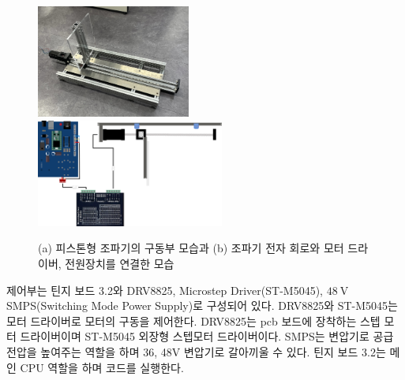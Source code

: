 \begin{figure}[H]
        \includegraphics[width=0.45\textwidth]{images/jopagi.jpg} 
        \includegraphics[width=0.55\textwidth]{images/wavemaker_control.png}
    \caption{(a) 피스톤형 조파기의 구동부 모습과 (b) 조파기 전자 회로와 모터 드라이버, 전원장치를 연결한 모습}
    \label{circuit}   
\end{figure} 


제어부는 틴지 보드 3.2와 DRV8825, Microstep Driver(ST-M5045), $48\mathrm{~V}$ SMPS(Switching Mode Power Supply)로 구성되어 있다. DRV8825와 ST-M5045는 모터 드라이버로 모터의 구동을 제어한다. DRV8825는 pcb 보드에 장착하는 스텝 모터 드라이버이며 ST-M5045 외장형 스텝모터 드라이버이다. SMPS는 변압기로 공급 전압을 높여주는 역할을 하며 36, 48V 변압기로 갈아끼울 수 있다. 틴지 보드 3.2는 메인 CPU 역할을 하며 코드를 실행한다.

